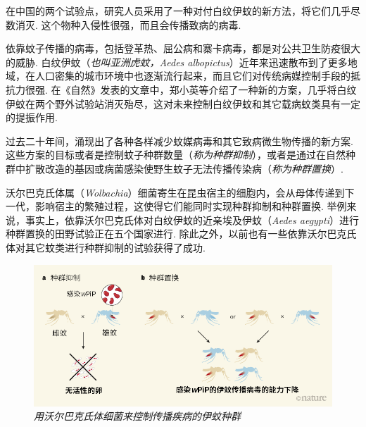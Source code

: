 \begin{multicols}{2}
\newcommand{\wPip }{\textit{w}PiP}
在中国的两个试验点，研究人员采用了一种对付白纹伊蚊的新方法，将它们几乎尽数消灭. 这个物种入侵性很强，而且会传播致病的病毒. 

依靠蚊子传播的病毒，包括登革热、屈公病和寨卡病毒，都是对公共卫生防疫很大的威胁. 白纹伊蚊（\textit{也叫亚洲虎蚊，Aedes albopictus}）近年来迅速散布到了更多地域，在人口密集的城市环境中也逐渐流行起来，而且它们对传统病媒控制手段的抵抗力很强. 在《自然》发表的文章中，郑小英等介绍了一种新的方案，几乎将白纹伊蚊在两个野外试验站消灭殆尽，这对未来控制白纹伊蚊和其它载病蚊类具有一定的提振作用. 

过去二十年间，涌现出了各种各样减少蚊媒病毒和其它致病微生物传播的新方案. 这些方案的目标或者是控制蚊子种群数量（\textit{称为种群抑制}），或者是通过在自然种群中扩散改造的基因或病菌感染使野生蚊子无法传播传染病（\textit{称为种群置换}）. 

沃尔巴克氏体属（\textit{Wolbachia}）细菌寄生在昆虫宿主的细胞内，会从母体传递到下一代，影响宿主的繁殖过程，这使得它们能同时实现种群抑制和种群置换. 举例来说，事实上，依靠沃尔巴克氏体对白纹伊蚊的近亲埃及伊蚊（\textit{Aedes aegypti}）进行种群置换的田野试验正在五个国家进行. 除此之外，以前也有一些依靠沃尔巴克氏体对其它蚊类进行种群抑制的试验获得了成功. 

\begin{figure}[H]
    \centering
    \includegraphics[width=\linewidth]{IMG/201908/6.png}
    \caption{\textit{用沃尔巴克氏体细菌来控制传播疾病的伊蚊种群}}
\end{figure}


\end{multicols}
